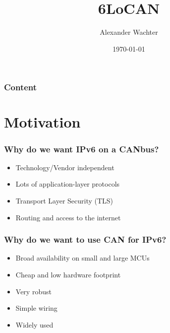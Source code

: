 \documentclass[aspectratio=169]{beamer}
\title[Title]{6LoCAN \\}
\author{Alexander Wachter}
\date{\today}
\institute[Institute of Technical Informatics]{ Institute of Technical Informatics\\ Networked Embedded Systems}
\begin{document}
\titleframe

\begin{frame}
  \frametitle{Content}
  \tableofcontents%
\end{frame}

\section{Motivation}

\begin{frame}
	\frametitle{Why do we want IPv6 on a CANbus?}
	\begin{itemize}
		\item Technology/Vendor independent
		\item Lots of application-layer protocols
		\item Transport Layer Security (TLS)
		\item Routing and access to the internet
	\end{itemize}
\end{frame}

\begin{frame}
	\frametitle{Why do we want to use CAN for IPv6?}
	\begin{itemize}
		\item Broad availability on small and large MCUs
		\item Cheap and low hardware footprint
		\item Very robust
		\item Simple wiring
		\item Widely used
	\end{itemize}
\end{frame}
\end{document}
